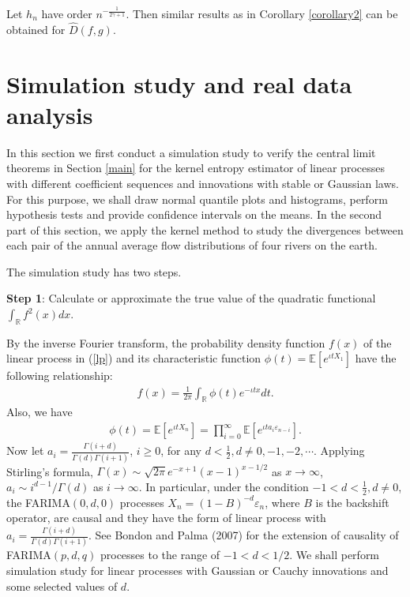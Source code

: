 \documentclass[11pt]{article}
\begin{document}
Let $h_n$ have order $n^{-\frac{1}{2\gamma+1}}$. Then similar results as in Corollary \ref{corollary2} can be obtained for $\widehat{D}(f,g)$.
\bigskip


\section{Simulation study and real data analysis}\label{simulation}

In this section we first conduct a simulation study to verify the central limit theorems in Section \ref{main} for the kernel entropy estimator of linear processes with different coefficient sequences and innovations with stable or Gaussian laws.  For this purpose, we shall draw normal quantile plots and histograms, perform hypothesis tests and provide confidence intervals on the means. In the second part of this section, we apply the kernel method to study the divergences between each pair of the annual average flow distributions of four rivers on the earth. 

The simulation study has two steps. 

{\bf Step 1}: Calculate or approximate the true value of the quadratic functional $\int_\mathbb{R} f^2(x) dx$.

By the inverse Fourier transform, the probability density function $f(x)$ of the linear process in (\ref{lp}) and its characteristic function $\phi(t)=\mathbb{E}[e^{\iota tX_1}]$ have the following relationship:
\begin{align}\label{inverseF}
f(x)=\frac{1}{2\pi}\int_{\mathbb{R}}\phi(t)e^{-\iota tx}dt.
\end{align}
Also, we have 
\begin{align*}
\phi(t)=\mathbb{E}[e^{\iota tX_n}]=\prod_{i=0}^\infty\mathbb{E}[e^{\iota t a_i \varepsilon_{n-i}}]. 
\end{align*}
Now let  $a_i=\frac{\Gamma(i+d)}{\Gamma(d)\Gamma(i+1)}$, $i\ge 0$, for any $d<\frac{1}{2}, d\ne 0, -1, -2, \cdots$. Applying Stirling's formula, $\Gamma(x)\sim \sqrt{2\pi}e^{-x+1}(x-1)^{x-1/2}$ as $x\rightarrow \infty$, $a_i\sim i^{d-1}/\Gamma(d)$ as $i\rightarrow \infty$. In particular, under the condition $-1<d<\frac{1}{2}, d\ne 0$,  the FARIMA$(0,d,0)$ processes $X_n=(1-B)^{-d}\varepsilon_n$,  where $B$ is the backshift operator, are causal and they have the form of linear process with $a_i=\frac{\Gamma(i+d)}{\Gamma(d)\Gamma(i+1)}$.  See Bondon and Palma (2007) for the extension of causality of FARIMA$(p,d,q)$ processes to the range of $-1<d<1/2$. We shall perform simulation study for linear processes with Gaussian or Cauchy innovations and some selected values of $d$. 
\end{document}
